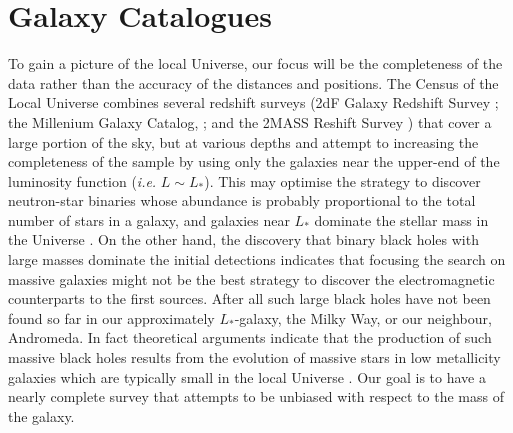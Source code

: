 \documentclass[useAMS,usenatbib]{mn2e}
\begin{document}
\section{Galaxy Catalogues}

To gain a picture of the local Universe, our focus will be the
completeness of the data rather than the accuracy of the distances and
positions.  The Census of the Local Universe
\citep[CLU;][]{2015arXiv150803608G} combines several redshift surveys
(2dF Galaxy Redshift Survey \citealt{2002MNRAS.336..907N}; the
Millenium Galaxy Catalog,
\citealt{2003MNRAS.344..307L,2005MNRAS.360...81D}; and the 2MASS
Reshift Survey \citealt{2012ApJS..199...26H}) that cover a large
portion of the sky, but at various depths and attempt to increasing
the completeness of the sample by using only the galaxies near the
upper-end of the luminosity function ({\em i.e.}  $L\sim L_*$).  This
may optimise the strategy to discover neutron-star binaries whose
abundance is probably proportional to the total number of stars in a
galaxy, and galaxies near $L_*$ dominate the stellar mass in the
Universe \citep[however see][for caveats to this
  assumption]{2010ApJ...725.1202L}.  On the other hand, the discovery
that binary black holes with large masses dominate the initial
detections indicates that focusing the search on massive galaxies
might not be the best strategy to discover the electromagnetic
counterparts to the first sources.  After all such large black holes
have not been found so far in our approximately $L_*$-galaxy, the
Milky Way, or our neighbour, Andromeda.  In fact theoretical arguments
indicate that the production of such massive black holes results from
the evolution of massive stars in low metallicity galaxies
\citep{2016ApJ...818L..22A,2016arXiv160203790E} which are typically
small in the local Universe \citep[e.g.][]{1997MNRAS.285..613H}. Our
goal is to have a nearly complete survey that attempts to be unbiased
with respect to the mass of the galaxy.
\end{document}
